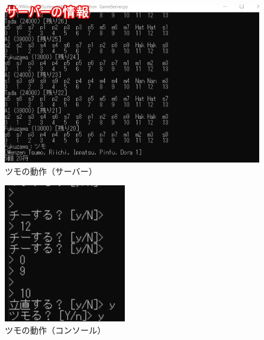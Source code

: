\documentclass[a4j,titlepage]{jsarticle}
\begin{document}
\begin{figure}[H]
  \centering
  \includegraphics[scale = 0.6]{images/tsumo_server.png}
  \caption{ツモの動作（サーバー）}
  \label{fig:tsumo_server}
\end{figure}

\begin{figure}[H]
  \centering
  \includegraphics[scale = 1.0]{images/tsumo_console.png}
  \caption{ツモの動作（コンソール）}
  \label{fig:tsumo_console}
\end{figure}
\end{document}
